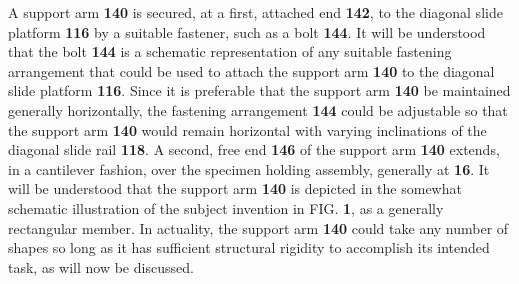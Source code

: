 \documentclass{article}
\begin{document}
A support arm \textbf{140} is secured, at a first, attached end \textbf{142}, to the diagonal slide platform \textbf{116} by a suitable fastener, such as a bolt \textbf{144}. It will be understood that the bolt \textbf{144} is a schematic representation of any suitable fastening arrangement that could be used to attach the support arm \textbf{140} to the diagonal slide platform \textbf{116}. Since it is preferable that the support arm \textbf{140} be maintained generally horizontally, the fastening arrangement \textbf{144} could be adjustable so that the support arm \textbf{140} would remain horizontal with varying inclinations of the diagonal slide rail \textbf{118}. A second, free end \textbf{146} of the support arm \textbf{140} extends, in a cantilever fashion, over the specimen holding assembly, generally at \textbf{16}. It will be understood that the support arm \textbf{140} is depicted in the somewhat schematic illustration of the subject invention in FIG. \textbf{1}, as a generally rectangular member. In actuality, the support arm \textbf{140} could take any number of shapes so long as it has sufficient structural rigidity to accomplish its intended task, as will now be discussed.
\end{document}
